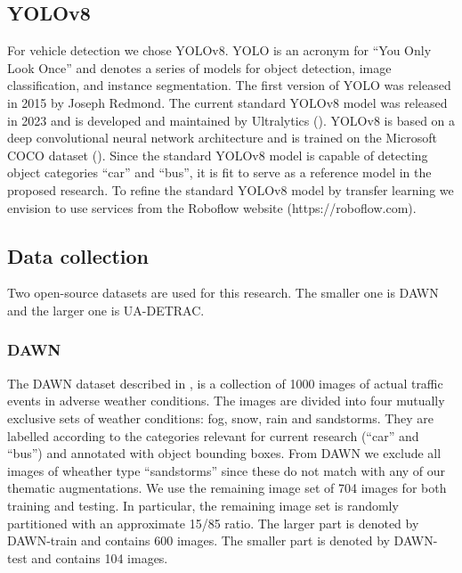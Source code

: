 \documentclass[]{article}
\begin{document}
\subsection{YOLOv8}

	For vehicle detection we chose YOLO{\small v8}. YOLO is an acronym for ``You Only Look Once'' and denotes a series of models for object detection, image classification, and instance segmentation. The first version of YOLO was released in 2015 by Joseph Redmond. The current standard YOLO{\small v8} model was released in 2023 and is developed and maintained by Ultralytics (\cite{yolov8_ultralytics}). YOLO{\small v8} is based on a deep convolutional neural network architecture and is trained on the Microsoft COCO dataset (\cite{linMicrosoftCOCOCommon2015a}). Since the standard YOLO{\small v8} model is capable of detecting object categories ``car'' and ``bus'', it is fit to serve as a reference model in the proposed research. To refine the standard YOLO{\small v8}  model by transfer learning we envision to use services from the Roboflow website (https://roboflow.com).  

\subsection{Data collection}

	Two open-source datasets are used for this research. The smaller one is DAWN and the larger one is UA-DETRAC.

\subsubsection{DAWN}

	The DAWN dataset described in \cite{bw1x-yh39-20}, is a collection of 1000 images of actual traffic events in adverse weather conditions. The images are divided into four mutually exclusive sets of weather conditions: fog, snow, rain and sandstorms. They are labelled according to the categories relevant for current research (``car'' and ``bus'') and annotated with object bounding boxes. From DAWN we exclude all images of wheather type ``sandstorms'' since these do not match with any of our thematic augmentations. We use the remaining image set of 704 images for both training and testing. In particular, the remaining image set is randomly partitioned with an approximate 15/85 ratio. The larger part is denoted by DAWN-train and contains 600 images. The smaller part is denoted by DAWN-test and contains 104 images.
\end{document}
